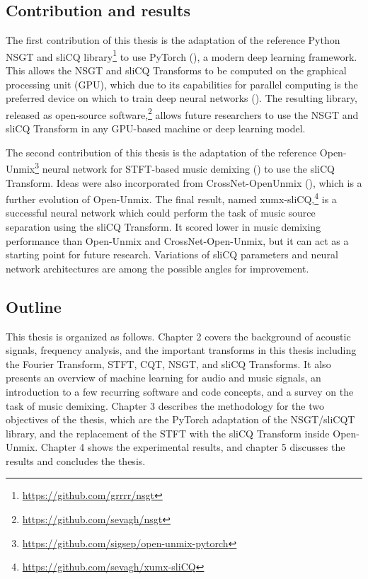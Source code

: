 \documentclass[report.tex]{subfiles}
\begin{document}
\subsection{Contribution and results}

The first contribution of this thesis is the adaptation of the reference Python NSGT and sliCQ library\footnote{\url{https://github.com/grrrr/nsgt}} to use PyTorch (\cite{pytorch}), a modern deep learning framework. This allows the NSGT and sliCQ Transforms to be computed on the graphical processing unit (GPU), which due to its capabilities for parallel computing is the preferred device on which to train deep neural networks (\cite{pytorch}). The resulting library, released as open-source software,\footnote{\url{https://github.com/sevagh/nsgt}} allows future researchers to use the NSGT and sliCQ Transform in any GPU-based machine or deep learning model.

The second contribution of this thesis is the adaptation of the reference Open-Unmix\footnote{\url{https://github.com/sigsep/open-unmix-pytorch}} neural network for STFT-based music demixing (\cite{umx}) to use the sliCQ Transform. Ideas were also incorporated from CrossNet-OpenUnmix (\cite{xumx}), which is a further evolution of Open-Unmix. The final result, named xumx-sliCQ,\footnote{\url{https://github.com/sevagh/xumx-sliCQ}} is a successful neural network which could perform the task of music source separation using the sliCQ Transform. It scored lower in music demixing performance than Open-Unmix and CrossNet-Open-Unmix, but it can act as a starting point for future research. Variations of sliCQ parameters and neural network architectures are among the possible angles for improvement.

\subsection{Outline}

This thesis is organized as follows. Chapter 2 covers the background of acoustic signals, frequency analysis, and the important transforms in this thesis including the Fourier Transform, STFT, CQT, NSGT, and sliCQ Transforms. It also presents an overview of machine learning for audio and music signals, an introduction to a few recurring software and code concepts, and a survey on the task of music demixing. Chapter 3 describes the methodology for the two objectives of the thesis, which are the PyTorch adaptation of the NSGT/sliCQT library, and the replacement of the STFT with the sliCQ Transform inside Open-Unmix. Chapter 4 shows the experimental results, and chapter 5 discusses the results and concludes the thesis.
\end{document}

